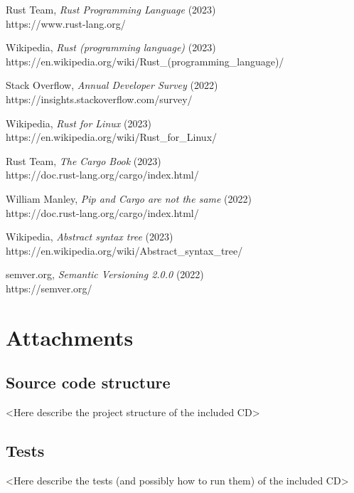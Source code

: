 \documentclass[licencjacka,en]{pracamgr}
\begin{document}
\begin{thebibliography}{99}\label{r:chapter_bibliography}


 Rust Team,
	\textit{Rust Programming Language} (2023) \\
	https://www.rust-lang.org/

 Wikipedia,
	\textit{Rust (programming language)} (2023) \\
	https://en.wikipedia.org/wiki/Rust\_(programming\_language)/

 Stack Overflow,
	\textit{Annual Developer Survey} (2022) \\
	https://insights.stackoverflow.com/survey/

 Wikipedia,
	\textit{Rust for Linux} (2023) \\
	https://en.wikipedia.org/wiki/Rust\_for\_Linux/

 Rust Team,
	\textit{The Cargo Book} (2023) \\
	https://doc.rust-lang.org/cargo/index.html/

 William Manley,
	\textit{Pip and Cargo are not the same} (2022) \\
	https://doc.rust-lang.org/cargo/index.html/

 Wikipedia,
	\textit{Abstract syntax tree} (2023) \\
	https://en.wikipedia.org/wiki/Abstract\_syntax\_tree/

 semver.org,
	\textit{Semantic Versioning 2.0.0} (2022) \\
	https://semver.org/

\end{thebibliography}


\chapter*{Attachments}\label{r:chapter_attachments}

\section*{Source code structure}

<Here describe the project structure of the included CD>


\section*{Tests}

<Here describe the tests (and possibly how to run them) of the included CD>
\end{document}
